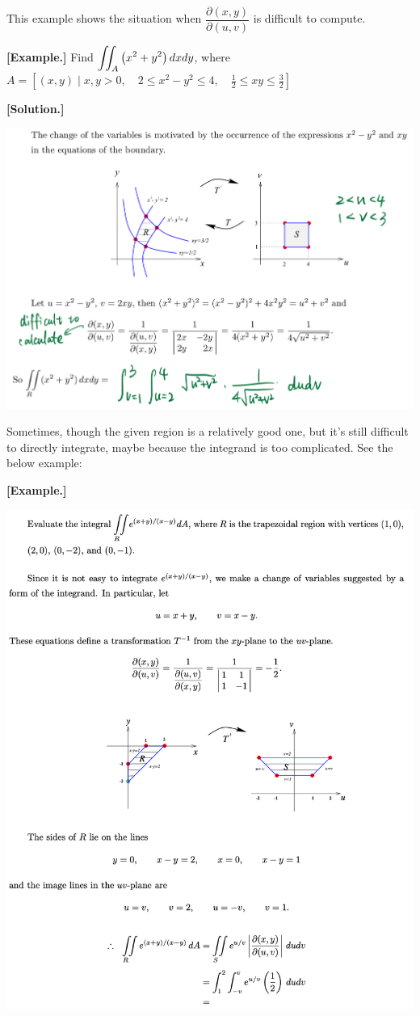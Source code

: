 \documentclass[11pt, a4paper]{MATH2023}
\newcommand{\eg}{\textbf{[Example.] }}
\newcommand{\sol}{\textbf{[Solution.] }}
\begin{document}
\begin{spacing}{1.3}
    \newpage
    {\blue This example shows the situation when $\dfrac{\partial(x, y)}{\partial(u, v)}$ is difficult to compute.}
    
    \eg Find $\displaystyle \iint_{A}\left(x^{2}+y^{2}\right) d x d y$, 
    where $A=\left[(x, y) \mid x, y>0, \quad 2 \leqslant x^{2}-y^{2} \leqslant 4, \quad \frac{1}{2} \leqslant x y \leqslant \frac{3}{2}\right]$

    \sol 
    
    \includegraphics[scale=0.25]{images/Ch14-jacobian-eg3.jpeg}


    \newpage
    Sometimes, though the given region is a relatively good one, but it's still difficult to directly
    integrate, maybe because the integrand is too complicated. See the below example:

    \eg 
    
    \includegraphics[scale=0.77]{images/Ch14-jacobian-eg4.png}



\end{spacing}
\end{document}
